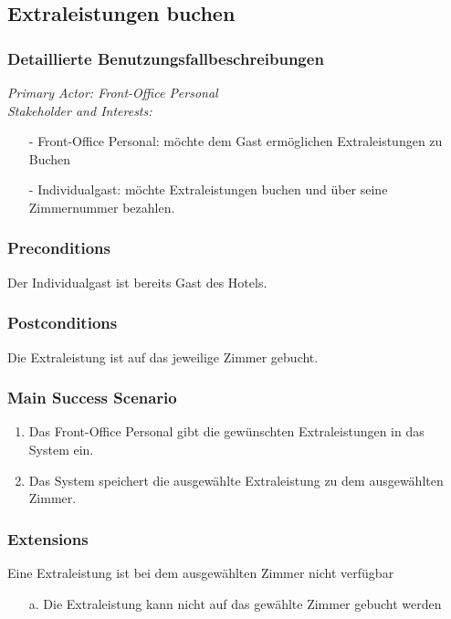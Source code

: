 \documentclass[./detailed_overview_usecases.tex]{subfiles}
\begin{document}
    \subsection{Extraleistungen buchen}
    \subsubsection{Detaillierte Benutzungsfallbeschreibungen}
    \textit{Primary Actor: Front-Office Personal}
    \\
    \textit{Stakeholder and Interests:}
    \begin{itemize}
        \item[-] Front-Office Personal: möchte dem Gast ermöglichen Extraleistungen zu Buchen
        \item[-] Individualgast: möchte Extraleistungen buchen und über seine Zimmernummer bezahlen.
    \end{itemize}

    \subsubsection*{Preconditions}
    Der Individualgast ist bereits Gast des Hotels.

    \subsubsection*{Postconditions}
    Die Extraleistung ist auf das jeweilige Zimmer gebucht.

    \subsubsection*{Main Success Scenario}
    \begin{enumerate}
        \item Das Front-Office Personal gibt die gewünschten Extraleistungen in das System ein.
        \item Das System speichert die ausgewählte Extraleistung zu dem ausgewählten Zimmer.
    \end{enumerate}

    \subsubsection*{Extensions}
    \item Eine Extraleistung ist bei dem ausgewählten Zimmer nicht verfügbar
    \begin{itemize}
        \item[a.] Die Extraleistung kann nicht auf das gewählte Zimmer gebucht werden
    \end{itemize}
\end{document}
